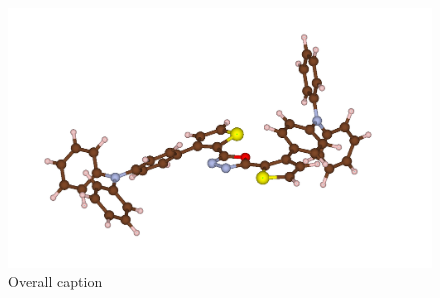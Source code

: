 
		\begin{figure}[htbp]
			\centering
			\includegraphics[width=1\textwidth]{./Figures/K2.png}
			\caption[Overall caption short. write something or remove incl brackets]{Overall caption}
			\label{fig:fig06}
		\end{figure}


